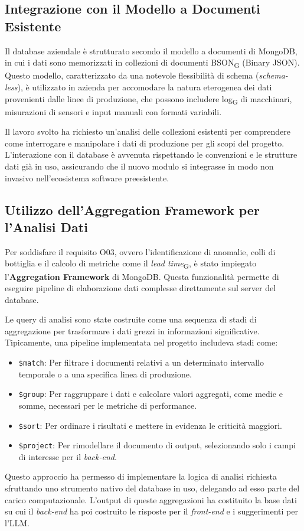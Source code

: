 \subsection{Integrazione con il Modello a Documenti Esistente}
Il database aziendale è strutturato secondo il modello a documenti di MongoDB, in cui i dati sono memorizzati in collezioni di documenti BSON\textsubscript{G} (Binary JSON). Questo modello, caratterizzato da una notevole flessibilità di schema (\textit{schema-less}), è utilizzato in azienda per accomodare la natura eterogenea dei dati provenienti dalle linee di produzione, che possono includere log\textsubscript{G} di macchinari, misurazioni di sensori e input manuali con formati variabili.

Il lavoro svolto ha richiesto un'analisi delle collezioni esistenti per comprendere come interrogare e manipolare i dati di produzione per gli scopi del progetto. L'interazione con il database è avvenuta rispettando le convenzioni e le strutture dati già in uso, assicurando che il nuovo modulo si integrasse in modo non invasivo nell'ecosistema software preesistente.

\subsection{Utilizzo dell'Aggregation Framework per l'Analisi Dati}
Per soddisfare il requisito O03, ovvero l'identificazione di anomalie, colli di bottiglia e il calcolo di metriche come il \textit{lead time}\textsubscript{G}, è stato impiegato l'\textbf{Aggregation Framework} di MongoDB. Questa funzionalità permette di eseguire pipeline di elaborazione dati complesse direttamente sul server del database.

Le query di analisi sono state costruite come una sequenza di stadi di aggregazione per trasformare i dati grezzi in informazioni significative. Tipicamente, una pipeline implementata nel progetto includeva stadi come:
\begin{itemize}
    \item \texttt{\$match}: Per filtrare i documenti relativi a un determinato intervallo temporale o a una specifica linea di produzione.
    \item \texttt{\$group}: Per raggruppare i dati e calcolare valori aggregati, come medie e somme, necessari per le metriche di performance.
    \item \texttt{\$sort}: Per ordinare i risultati e mettere in evidenza le criticità maggiori.
    \item \texttt{\$project}: Per rimodellare il documento di output, selezionando solo i campi di interesse per il \textit{back-end}.
\end{itemize}
Questo approccio ha permesso di implementare la logica di analisi richiesta sfruttando uno strumento nativo del database in uso, delegando ad esso parte del carico computazionale. L'output di queste aggregazioni ha costituito la base dati su cui il \textit{back-end} ha poi costruito le risposte per il \textit{front-end} e i suggerimenti per l'LLM.